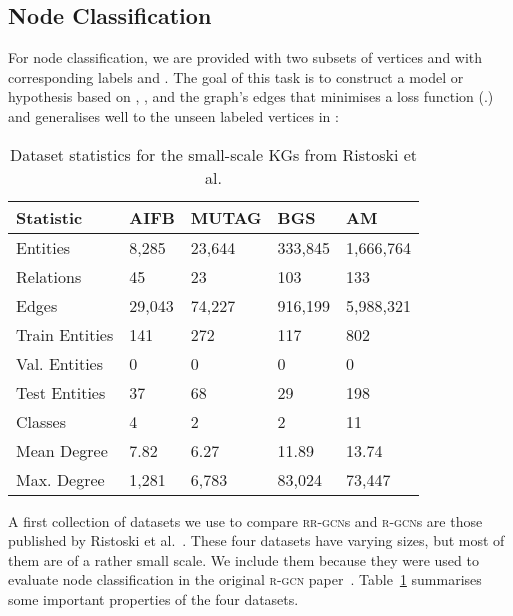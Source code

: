 \documentclass{llncs}
\begin{document}
\subsection{Node Classification}
For node classification, we are provided with two subsets of vertices  and  with corresponding labels  and . The goal of this task is to construct a model or hypothesis  based on , , and the graph's edges  that minimises a loss function (.) and generalises well to the unseen labeled vertices in :


\setlength{\tabcolsep}{8pt}
\begin{table}[h!]
\begin{center}
 
\begin{tabular}{lllll}\toprule
 \textbf{Statistic}           & \textbf{AIFB} & \textbf{MUTAG}   & \textbf{BGS} & \textbf{AM}\\\midrule
Entities  &  8,285  & 23,644  & 333,845 & 1,666,764 \\
Relations  & 45  & 23  & 103 & 133  \\
Edges  &  29,043 & 74,227 & 916,199 & 5,988,321 \\
Train Entities  & 141  &  272 & 117 & 802  \\
Val. Entities  & 0 & 0 & 0 & 0  \\
Test Entities  & 37  & 68 & 29 &  198 \\
Classes  & 4  & 2  & 2 & 11 \\
Mean Degree & 7.82 & 6.27 & 11.89 & 13.74 \\
Max. Degree & 1,281 & 6,783 & 83,024 & 73,447 \\ \bottomrule
\end{tabular}
\end{center}
\caption{Dataset statistics for the small-scale KGs from Ristoski et al.\label{table:statistics}}
\end{table}

A first collection of datasets we use to compare \textsc{rr-gcn}s and \textsc{r-gcn}s are those published by Ristoski et al.~\cite{ristoski2016collection}. These four datasets have varying sizes, but most of them are of a rather small scale. We include them because they were used to evaluate node classification in the original \textsc{r-gcn} paper~\cite{schlichtkrull2018modeling}. Table~\ref{table:statistics} summarises some important properties of the four datasets.
\end{document}
